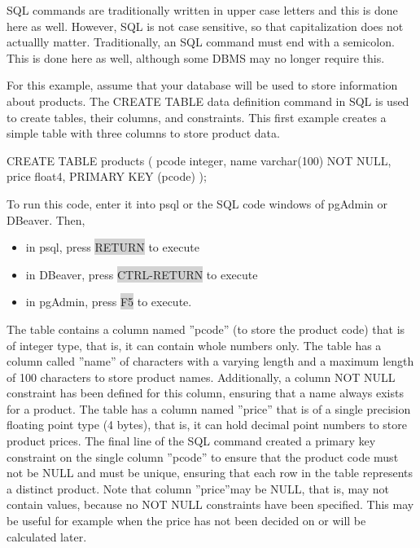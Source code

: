 \begin{infobox}
SQL commands are traditionally written in upper case letters and this is done here as well. However, SQL is not case sensitive, so that capitalization does not actuallly matter. Traditionally, an SQL command must end with a semicolon. This is done here as well, although some DBMS may no longer require this. 
\end{infobox}

For this example, assume that your database will be used to store information about products. The CREATE TABLE data definition command in SQL is used to create tables, their columns, and constraints. This first example creates a simple table with three columns to store product data.

\begin{sqlcode}
CREATE TABLE products (
  pcode integer,
  name  varchar(100) NOT NULL,
  price float4,
  PRIMARY KEY (pcode) 
);
\end{sqlcode}

\begin{infobox}
To run this code, enter it into psql or the SQL code windows of pgAdmin or DBeaver. Then,
\begin{itemize}
   \item in psql, press \colorbox{lightgray}{RETURN} to execute
   \item in DBeaver, press \colorbox{lightgray}{CTRL-RETURN} to execute
   \item in pgAdmin, press \colorbox{lightgray}{F5} to execute.
\end{itemize}
\end{infobox}

The table contains a column named ''pcode'' (to store the product code) that is of integer type, that is, it can contain whole numbers only. The table has a column called ''name'' of characters with a varying length and a maximum length of 100 characters to store product names. Additionally, a column NOT NULL constraint has been defined for this column, ensuring that a name always exists for a product. The table has a column named ''price'' that is of a single precision floating point type (4 bytes), that is, it can hold decimal point numbers to store product prices. The final line of the SQL command created a primary key constraint on the single column ''pcode'' to ensure that the product code must not be NULL and must be unique, ensuring that each row in the table represents a distinct product. Note that column ''price''may be NULL, that is, may not contain values, because no NOT NULL constraints have been specified. This may be useful for example when the price has not been decided on or will be calculated later.

